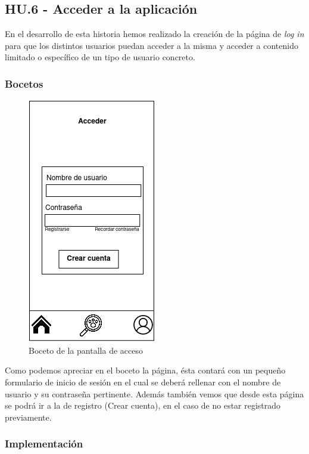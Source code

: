 \subsection{HU.6 - Acceder a la aplicación}

En el desarrollo de esta historia hemos realizado la creación de la página de \textit{log in} para que los distintos usuarios puedan acceder a la misma y acceder a contenido limitado o específico de un tipo de usuario concreto. \\ 

\subsubsection{Bocetos}


\begin{figure}[H]
	\centering
	\includegraphics[width=0.31\linewidth]{"sprint 2/hu6/login"}
	\caption{Boceto de la pantalla de acceso}
	\label{fig:login}
\end{figure}

Como podemos apreciar en el boceto la página, ésta contará con un pequeño formulario de inicio de sesión en el cual se deberá rellenar con el nombre de usuario y su contraseña pertinente. Además también vemos que desde esta página se podrá ir a la de registro (Crear cuenta), en el caso de no estar registrado previamente. \\

\subsubsection{Implementación}

